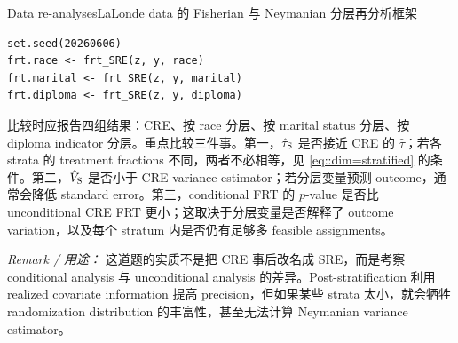 \begin{exercisesolution}{Data re-analyses}{LaLonde data 的 Fisherian 与 Neymanian 分层再分析框架}
\begin{lstlisting}
set.seed(20260606)
frt.race <- frt_SRE(z, y, race)
frt.marital <- frt_SRE(z, y, marital)
frt.diploma <- frt_SRE(z, y, diploma)
\end{lstlisting}

比较时应报告四组结果：CRE、按 race 分层、按 marital status 分层、按 diploma indicator 分层。重点比较三件事。第一，$\hat\tau_{\textsc{S}}$ 是否接近 CRE 的 $\hat\tau$；若各 strata 的 treatment fractions 不同，两者不必相等，见 \cref{eq::dim=stratified} 的条件。第二，$\hat V_{\textsc{S}}$ 是否小于 CRE variance estimator；若分层变量预测 outcome，通常会降低 standard error。第三，conditional FRT 的 $p$-value 是否比 unconditional CRE FRT 更小；这取决于分层变量是否解释了 outcome variation，以及每个 stratum 内是否仍有足够多 feasible assignments。

\emph{Remark / 用途：} 这道题的实质不是把 CRE 事后改名成 SRE，而是考察 conditional analysis 与 unconditional analysis 的差异。Post-stratification 利用 realized covariate information 提高 precision，但如果某些 strata 太小，就会牺牲 randomization distribution 的丰富性，甚至无法计算 Neymanian variance estimator。
\end{exercisesolution}
